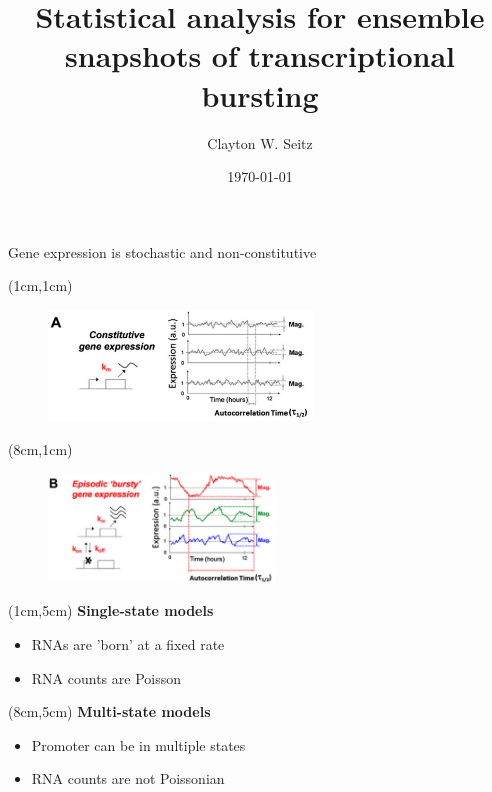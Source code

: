 \documentclass[aspectratio=1610]{beamer}					%
\title{Statistical analysis for ensemble snapshots of transcriptional bursting}	%
\author{Clayton W. Seitz}								%
\date{\today}									%
\begin{document}
\begin{frame}
  \titlepage
\end{frame}


%



\begin{frame}{Gene expression is stochastic and non-constitutive}


\begin{textblock*}{7cm}(1cm,1cm)
\begin{figure}
\includegraphics[width=7cm]{burst-1.png}
\end{figure}
\end{textblock*}

\begin{textblock*}{7cm}(8cm,1cm)
\begin{figure}
\includegraphics[width=6cm]{burst-2.png}
\end{figure}
\end{textblock*}


\begin{textblock*}{6cm}(1cm,5cm)
\hspace{0.5in}\textbf{Single-state models}
\begin{itemize}
\item RNAs are 'born' at a fixed rate
\item RNA counts are Poisson
\end{itemize}
\end{textblock*}

\begin{textblock*}{6cm}(8cm,5cm)
\hspace{0.5in}\textbf{Multi-state models}
\begin{itemize}
\item Promoter can be in multiple states
\item RNA counts are not Poissonian
\end{itemize}


\end{textblock*}
\end{frame}
\end{document}

